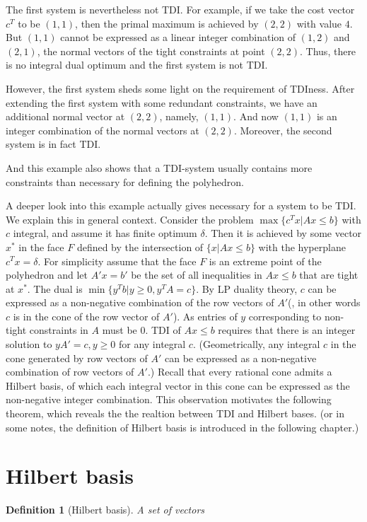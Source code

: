 \documentclass{article}
\newtheorem{definition}[theorem]{Definition}
\begin{document}
The first system is nevertheless not TDI. For example, if we take the cost vector $c^T$ to be $(1,1)$, then the primal maximum is achieved by $(2,2)$ with value $4$. But $(1,1)$ cannot be expressed as a linear integer combination of $(1,2)$ and $(2,1)$, the normal vectors of the tight constraints at point $(2,2)$. Thus, there is no integral dual optimum and the first system is not TDI.

However, the first system sheds some light on the requirement of TDIness. After extending the first system with some redundant constraints, we have an additional normal vector at $(2,2)$, namely, $(1,1)$. And now $(1,1)$ is an integer combination of the normal vectors at $(2,2)$. Moreover, the second system is in fact TDI.

And this example also shows that a TDI-system usually contains more constraints than necessary for defining the polyhedron.

A deeper look into this example actually gives necessary for a system to be TDI. We explain this in general context. Consider the problem $\max\{c^T x|Ax\leq b\}$ with $c$ integral, and assume it has finite optimum $\delta$. Then it is achieved by some vector $x^*$ in the face $F$ defined by the intersection of $\{x|Ax\leq b\}$ with the hyperplane $c^T x=\delta$. For simplicity assume that the face $F$ is an extreme point of the polyhedron and let $A'x=b'$ be the set of all inequalities in $Ax\leq b$ that are tight at $x^*$. The dual is $\min\{y^T b|y\geq 0, y^T A=c\}$. By LP duality theory, $c$ can be expressed as a non-negative combination of the row vectors of $A'$(, in other words $c$ is in the cone of the row vector of $A'$). As entries of $y$ corresponding to non-tight constraints in $A$ must be $0$. TDI of $Ax\leq b$ requires that there is an integer solution to $yA'=c,y\geq 0$ for any integral $c$. (Geometrically, any integral $c$ in the cone generated by row vectors of $A'$ can be expressed as a non-negative combination of row vectors of $A'$.) Recall that every rational cone admits a Hilbert basis, of which each integral vector in this cone can be expressed as the non-negative integer combination. This observation motivates the following theorem, which reveals the the realtion between TDI and Hilbert bases. (or in some notes, the definition of Hilbert basis is introduced in the following chapter.) 

\section{Hilbert basis}
\begin{definition}[Hilbert basis]
A set of vectors 
\end{definition}
\end{document}
